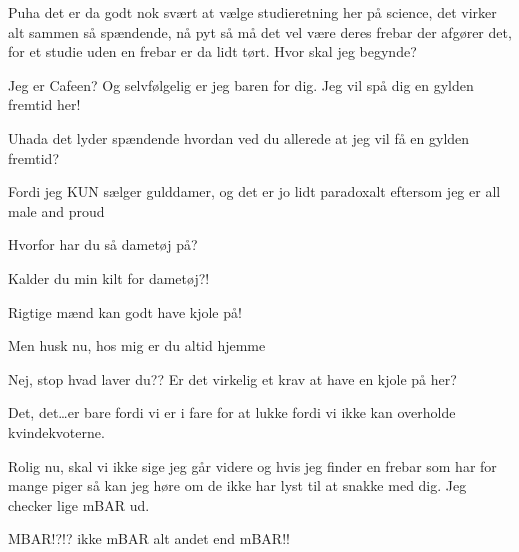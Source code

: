 \documentclass[a4paper,11pt]{article}
\begin{document}
\begin{sketch}



Puha det er da godt nok svært at vælge studieretning her på science, det virker alt sammen så spændende, nå pyt så må det vel være deres frebar der afgører det, for et studie uden en frebar er da lidt tørt. Hvor skal jeg begynde?


 Jeg er Cafeen? Og selvfølgelig er jeg baren for dig. Jeg vil spå dig en gylden fremtid her!

Uhada det lyder spændende hvordan ved du allerede at jeg vil få en gylden fremtid?

Fordi jeg KUN sælger gulddamer, og det er jo lidt paradoxalt eftersom jeg er all male and proud

Hvorfor har du så dametøj på?


Kalder du min kilt for dametøj?!


Rigtige mænd kan godt have kjole på! 


Men husk nu, hos mig er du altid hjemme


Nej, stop hvad laver du?? Er det virkelig et krav at have en kjole på her?


Det, det\ldots er bare fordi vi er i fare for at lukke fordi vi ikke kan overholde kvindekvoterne.

Rolig nu, skal vi ikke sige jeg går videre og hvis jeg finder en frebar som har for mange piger så kan jeg høre om de ikke har lyst til at snakke med dig. Jeg checker lige mBAR ud.

MBAR!?!? ikke mBAR alt andet end mBAR!!


\end{sketch}
\end{document}

